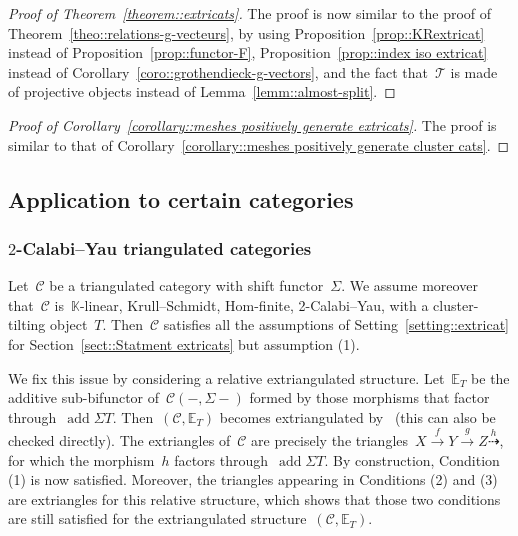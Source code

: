\documentclass{amsart}
\theoremstyle{definition}
\newcommand{\field}{\mathbb{K}}
\newcommand{\cat}{\mathcal{C}}
\newcommand{\susp}{\Sigma}
\newcommand{\add}{\operatorname{add}}
\newcommand{\tc}{\mathcal{T}}
\begin{document}
\begin{proof}[Proof of Theorem~\ref{theorem::extricats}]
 The proof is now similar to the proof of Theorem~\ref{theo::relations-g-vecteurs}, by using Proposition~\ref{prop::KRextricat} instead of Proposition~\ref{prop::functor-F}, Proposition~\ref{prop::index iso extricat} instead of Corollary~\ref{coro::grothendieck-g-vectors}, and the fact that~$\tc$ is made of projective objects instead of Lemma~\ref{lemm::almost-split}.
\end{proof}

\begin{proof}[Proof of Corollary~\ref{corollary::meshes positively generate extricats}]
The proof is similar to that of Corollary~\ref{corollary::meshes positively generate cluster cats}.
\end{proof}



\subsection{Application to certain categories}


\subsubsection{$2$-Calabi--Yau triangulated categories}
\label{sect::2CYTriangulated}

Let~$\cat$ be a triangulated category with shift functor~$\susp$.
We assume moreover that~$\cat$ is~$\field$-linear, Krull--Schmidt, Hom-finite, 2-Calabi--Yau, with a cluster-tilting object~$T$.
Then~$\cat$ satisfies all the assumptions of Setting~\ref{setting::extricat} for Section~\ref{sect::Statment extricats} but assumption (1).

We fix this issue by considering a relative extriangulated structure.
Let~$\mathbb{E}_T$ be the additive sub-bifunctor of~$\cat(-,\susp -)$ formed by those morphisms that factor through~$\add\susp T$.
Then~$(\cat,\mathbb{E}_T)$ becomes extriangulated by~\cite[Proposition 3.14]{HerschendLiuNakaoka} (this can also be checked directly).
The extriangles of~$\cat$ are precisely the triangles~$X\overset{f}{\rightarrow}Y\overset{g}{\rightarrow} Z \overset{h}{\dashrightarrow}$, for which the morphism~$h$ factors through~$\add\susp T$.
By construction, Condition (1) is now satisfied.
Moreover, the triangles appearing in Conditions (2) and (3) are extriangles for this relative structure, which shows that those two conditions are still satisfied for the extriangulated structure~$(\cat,\mathbb{E}_T)$.
\end{document}
